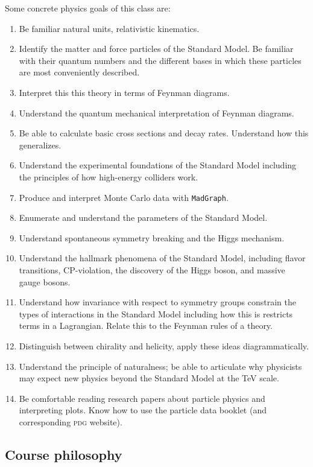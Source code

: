 \documentclass[12pt]{article}
\newcommand{\acro}[1]{\textsc{\MakeLowercase{#1}}}
\numberwithin{equation}{section}    %
\begin{document}
Some concrete physics goals of this class are:
\begin{enumerate}
	\item Be familiar natural units, relativistic kinematics.
	\item Identify the matter and force particles of the Standard Model. Be familiar with their quantum numbers and the different bases in which these particles are most conveniently described.
	\item Interpret this this theory in terms of Feynman diagrams.
	\item Understand the quantum mechanical interpretation of Feynman diagrams.
	\item Be able to calculate basic cross sections and decay rates. Understand how this generalizes. 
	\item Understand the experimental foundations of the Standard Model including the principles of how high-energy colliders work.
	\item Produce and interpret Monte Carlo data with \texttt{MadGraph}. 
	\item Enumerate and understand the parameters of the Standard Model.
	\item Understand spontaneous symmetry breaking and the Higgs mechanism.
	\item Understand the hallmark phenomena of the Standard Model, including flavor transitions, CP-violation, the discovery of the Higgs boson, and massive gauge bosons.
	\item Understand how invariance with respect to symmetry groups constrain the types of interactions in the Standard Model including how this is restricts terms in a Lagrangian. Relate this to the Feynman rules of a theory.
	\item Distinguish between chirality and helicity, apply these ideas diagrammatically.
	\item Understand the principle of naturalness; be able to articulate why physicists may expect new physics beyond the Standard Model at the TeV scale.
	\item Be comfortable reading research papers about particle physics and interpreting plots. Know how to use the particle data booklet (and corresponding \acro{PDG} website).
\end{enumerate}

\subsection*{Course philosophy}
\end{document}
